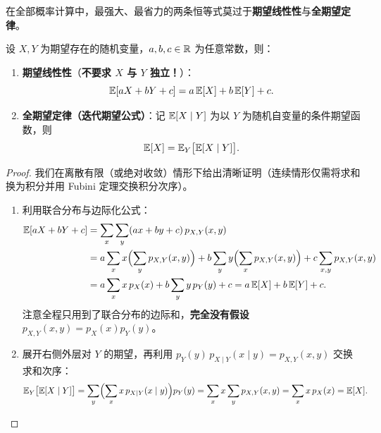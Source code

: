 在全部概率计算中，最强大、最省力的两条恒等式莫过于\textbf{期望线性性}与\textbf{全期望定律}。

\begin{thmBox}
\begin{theorem}
\label{thm:ch1-expectation-laws}
设 $X, Y$ 为期望存在的随机变量，$a, b, c \in \mathbb{R}$ 为任意常数，则：
\begin{enumerate}
  \item \textbf{期望线性性}（\textbf{不要求 $X$ 与 $Y$ 独立！}）：
  \begin{equation}
    \mathbb{E}[aX + bY + c] = a\,\mathbb{E}[X] + b\,\mathbb{E}[Y] + c. \label{eq:ch1-linearity}
  \end{equation}
  \item \textbf{全期望定律（迭代期望公式）}：记 $\mathbb{E}[X \mid Y]$ 为以 $Y$ 为随机自变量的条件期望函数，则
  \begin{equation}
    \mathbb{E}[X] = \mathbb{E}_Y\bigl[\mathbb{E}[X \mid Y]\bigr]. \label{eq:ch1-tower}
  \end{equation}
\end{enumerate}
\end{theorem}
\end{thmBox}

\begin{proof}
我们在离散有限（或绝对收敛）情形下给出清晰证明（连续情形仅需将求和换为积分并用 Fubini 定理交换积分次序）。
\begin{enumerate}
  \item 利用联合分布与边际化公式：
  \begin{align*}
    \mathbb{E}[aX + bY + c]
    &= \sum_x \sum_y (ax + by + c)\,p_{X,Y}(x, y) \\
    &= a \sum_x x \Bigl(\sum_y p_{X,Y}(x,y)\Bigr) + b \sum_y y \Bigl(\sum_x p_{X,Y}(x,y)\Bigr) + c \sum_{x,y} p_{X,Y}(x,y) \\
    &= a \sum_x x\,p_X(x) + b \sum_y y\,p_Y(y) + c = a\,\mathbb{E}[X] + b\,\mathbb{E}[Y] + c.
  \end{align*}
  注意全程只用到了联合分布的边际和，\textbf{完全没有假设} $p_{X,Y}(x,y) = p_X(x)p_Y(y)$。
  \item 展开右侧外层对 $Y$ 的期望，再利用 $p_Y(y)\,p_{X\mid Y}(x\mid y) = p_{X,Y}(x,y)$ 交换求和次序：
  \begin{align*}
    \mathbb{E}_Y\bigl[\mathbb{E}[X \mid Y]\bigr]
    &= \sum_y \Bigl(\sum_x x\,p_{X\mid Y}(x \mid y)\Bigr) p_Y(y)
     = \sum_x x \sum_y p_{X,Y}(x, y)
     = \sum_x x\,p_X(x) = \mathbb{E}[X]. \qedhere
  \end{align*}
\end{enumerate}
\end{proof}

